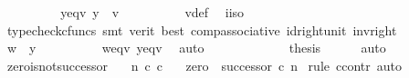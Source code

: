 \begin{isabellebody}
\isanewline
\ \ \ \ \ \ \isamarkupfalse%
\ \isamarkupfalse%
\ y{\isacharunderscore}{\kern0pt}eq{\isacharunderscore}{\kern0pt}v{\isacharcolon}{\kern0pt}\ {\isachardoublequoteopen}y\ {\isacharequal}{\kern0pt}\ v{\isachardoublequoteclose}\isanewline
\ \ \ \ \ \ \ \ \isamarkupfalse%
\ v{\isacharunderscore}{\kern0pt}def\ \isamarkupfalse%
\ i{\isacharunderscore}{\kern0pt}iso\isanewline
\ \ \ \ \ \ \ \ \isamarkupfalse%
\ {\isacharparenleft}{\kern0pt}typecheck{\isacharunderscore}{\kern0pt}cfuncs{\isacharcomma}{\kern0pt}\ smt\ {\isacharparenleft}{\kern0pt}verit{\isacharcomma}{\kern0pt}\ best{\isacharparenright}{\kern0pt}\ comp{\isacharunderscore}{\kern0pt}associative{}\ id{\isacharunderscore}{\kern0pt}right{\isacharunderscore}{\kern0pt}unit{}\ inv{\isacharunderscore}{\kern0pt}right{\isacharparenright}{\kern0pt}\isanewline
\ \ \ \ \ \ \isamarkupfalse%
\ {\isachardoublequoteopen}w\ {\isacharequal}{\kern0pt}\ y{\isachardoublequoteclose}\isanewline
\ \ \ \ \ \ \ \ \isamarkupfalse%
\ w{\isacharunderscore}{\kern0pt}eq{\isacharunderscore}{\kern0pt}v\ y{\isacharunderscore}{\kern0pt}eq{\isacharunderscore}{\kern0pt}v\ \isamarkupfalse%
\ auto\isanewline
\ \ \ \ \isamarkupfalse%
\isanewline
\ \ \isamarkupfalse%
\isanewline
\ \ \isamarkupfalse%
\ \isamarkupfalse%
\ {\isacharquery}{\kern0pt}thesis\isanewline
\ \ \ \ \isamarkupfalse%
\ auto\isanewline
{}\isamarkupfalse%
%
\endisatagproof
{\isafoldproof}%
%
\isadelimproof
%
\endisadelimproof
%
\isadelimdocument
%
\endisadelimdocument
%
\isatagdocument
%
\isamarkuptrue%
%
\endisatagdocument
{\isafolddocument}%
%
\isadelimdocument
%
\endisadelimdocument
{}\isamarkupfalse%
\ zero{\isacharunderscore}{\kern0pt}is{\isacharunderscore}{\kern0pt}not{\isacharunderscore}{\kern0pt}successor{\isacharcolon}{\kern0pt}\isanewline
\ \ \ {\isachardoublequoteopen}n\ {\isasymin}\isactrlsub c\ {\isasymnat}\isactrlsub c{\isachardoublequoteclose}\isanewline
\ \ \ {\isachardoublequoteopen}zero\ {\isasymnoteq}\ successor\ {\isasymcirc}\isactrlsub c\ n{\isachardoublequoteclose}\isanewline
%
\isadelimproof
%
\endisadelimproof
%
\isatagproof
{}\isamarkupfalse%
\ {\isacharparenleft}{\kern0pt}rule\ ccontr{\isacharcomma}{\kern0pt}\ auto{\isacharparenright}{\kern0pt}\isanewline
\ \ \isamarkupfalse%

\end{isabellebody}
